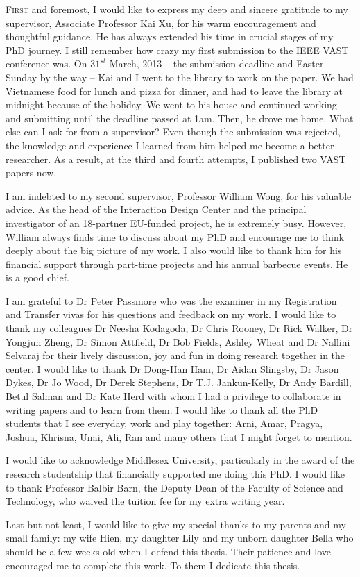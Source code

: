 
\begin{acknowledgements}      
\lettrine{F}{irst} and foremost, I would like to express my deep and sincere gratitude to my supervisor, Associate Professor Kai Xu, for his warm encouragement and thoughtful guidance. He has always extended his time in crucial stages of my PhD journey. I still remember how crazy my first submission to the IEEE VAST conference was. On $31^{st}$ March, 2013 -- the submission deadline and Easter Sunday by the way -- Kai and I went to the library to work on the paper. We had Vietnamese food for lunch and pizza for dinner, and had to leave the library at midnight because of the holiday. We went to his house and continued working and submitting until the deadline passed at 1am. Then, he drove me home. What else can I ask for from a supervisor? Even though the submission was rejected, the knowledge and experience I learned from him helped me become a better researcher. As a result, at the third and fourth attempts, I published two VAST papers now.

I am indebted to my second supervisor, Professor William Wong, for his valuable advice. As the head of the Interaction Design Center and the principal investigator of an 18-partner EU-funded project, he is extremely busy. However, William always finds time to discuss about my PhD and encourage me to think deeply about the big picture of my work. I also would like to thank him for his financial support through part-time projects and his annual barbecue events. He is a good chief.

I am grateful to Dr Peter Passmore who was the examiner in my Registration and Transfer vivas for his questions and feedback on my work. I would like to thank my colleagues Dr Neesha Kodagoda, Dr Chris Rooney, Dr Rick Walker, Dr Yongjun Zheng, Dr Simon Attfield, Dr Bob Fields, Ashley Wheat and Dr Nallini Selvaraj for their lively discussion, joy and fun in doing research together in the center. I would like to thank Dr Dong-Han Ham, Dr Aidan Slingsby, Dr Jason Dykes, Dr Jo Wood, Dr Derek Stephens, Dr T.J. Jankun-Kelly, Dr Andy Bardill,  Betul Salman and Dr Kate Herd with whom I had a privilege to collaborate in writing papers and to learn from them. I would like to thank all the PhD students that I see everyday, work and play together: Arni, Amar, Pragya, Joshua, Khrisna, Unai, Ali, Ran and many others that I might forget to mention.

I would like to acknowledge Middlesex University, particularly in the award of the research studentship that financially supported me doing this PhD. I would like to thank Professor Balbir Barn, the Deputy Dean of the Faculty of Science and Technology, who waived the tuition fee for my extra writing year.

Last but not least, I would like to give my special thanks to my parents and my small family: my wife Hien, my daughter Lily and my unborn daughter Bella who should be a few weeks old when I defend this thesis. Their patience and love encouraged me to complete this work. To them I
dedicate this thesis.

\end{acknowledgements}
